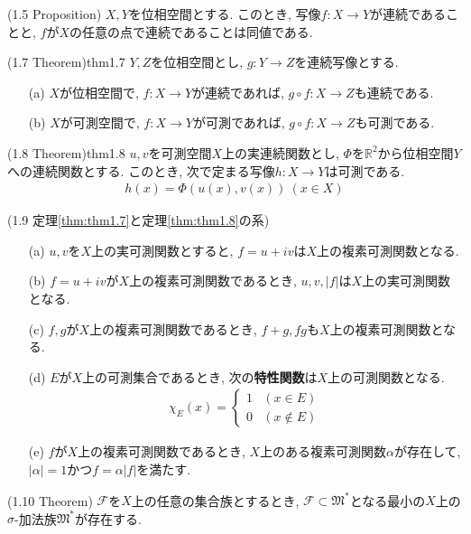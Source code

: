 \documentclass[a4paper]{jsarticle}
\begin{document}
\begin{prop}{(1.5 Proposition)}{}
    $X, Y$を位相空間とする. このとき, 写像$f:X\to Y$が連続であることと, $f$が$X$の任意の点で連続であることは同値である.
\end{prop}
\begin{thm}{(1.7 Theorem)}{thm1.7}
    $Y, Z$を位相空間とし, $g:Y\to Z$を連続写像とする.
    \begin{enumerate}
        \item[(a)] $X$が位相空間で, $f:X\to Y$が連続であれば, $g\circ f:X\to Z$も連続である.
        \item[(b)] $X$が可測空間で, $f:X\to Y$が可測であれば, $g\circ f:X\to Z$も可測である.
    \end{enumerate}
\end{thm}
\begin{thm}{(1.8 Theorem)}{thm1.8}
    $u, v$を可測空間$X$上の実連続関数とし, $\Phi$を$\mathbb{R}^2$から位相空間$Y$への連続関数とする. このとき, 次で定まる写像$h:X\to Y$は可測である.
    \begin{align*}
        h(x) = \Phi(u(x), v(x)) \ (x\in X)
    \end{align*}
\end{thm}
\begin{cor}{(1.9 定理\ref{thm:thm1.7}と定理\ref{thm:thm1.8}の系)}{}
    \begin{enumerate}
        \item[(a)] $u,v$を$X$上の実可測関数とすると, $f=u+iv$は$X$上の複素可測関数となる.
        \item[(b)] $f=u+iv$が$X$上の複素可測関数であるとき, $u, v, |f|$は$X$上の実可測関数となる.
        \item[(c)] $f, g$が$X$上の複素可測関数であるとき, $f+g, fg$も$X$上の複素可測関数となる.
        \item[(d)] $E$が$X$上の可測集合であるとき, 次の{\bf 特性関数}は$X$上の可測関数となる.
        \begin{align*}
            \chi_E(x) = \begin{cases}
                1 & (x\in E) \\
                0 & (x\notin E)
            \end{cases}
        \end{align*}
        \item[(e)] $f$が$X$上の複素可測関数であるとき, $X$上のある複素可測関数$\alpha$が存在して, $|\alpha|=1$かつ$f=\alpha|f|$を満たす.
    \end{enumerate}    
\end{cor}
\begin{thm}{(1.10 Theorem)}{}
    $\mathscr{F}$を$X$上の任意の集合族とするとき, $\mathscr{F}\subset \mathfrak{M}^*$となる最小の$X$上の$\sigma$-加法族$\mathfrak{M}^*$が存在する.
\end{thm}
\end{document}
